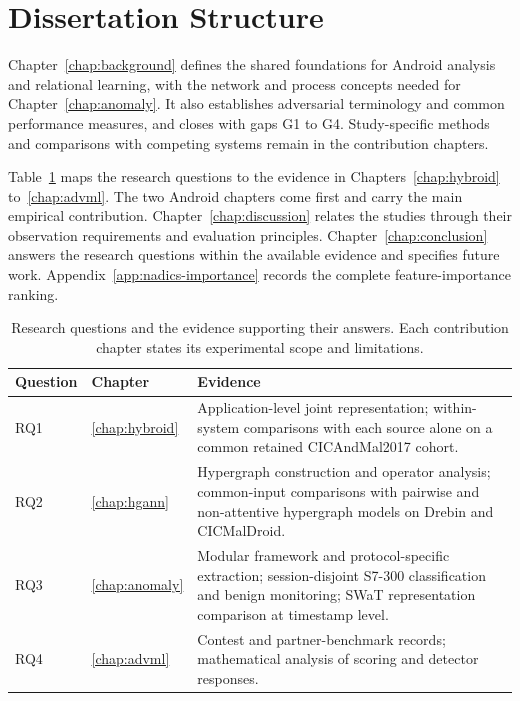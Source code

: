 \section{Dissertation Structure}
\label{sec:intro:structure}

Chapter~\ref{chap:background} defines the shared foundations for Android analysis and
relational learning, with the network and process concepts needed for
Chapter~\ref{chap:anomaly}. It also establishes adversarial terminology and common
performance measures, and closes with gaps G1 to G4. Study-specific methods and comparisons
with competing systems remain in the contribution chapters.

Table~\ref{tab:intro:map} maps the research questions to the evidence in
Chapters~\ref{chap:hybroid} to~\ref{chap:advml}. The two Android chapters come first and carry
the main empirical contribution. Chapter~\ref{chap:discussion} relates the studies through their
observation requirements and evaluation principles. Chapter~\ref{chap:conclusion} answers
the research questions within the available evidence and specifies future work.
Appendix~\ref{app:nadics-importance} records the complete \nadics{} feature-importance ranking.

\begin{table}[htbp]
  \caption{Research questions and the evidence supporting their answers.
  Each contribution chapter states its experimental scope and limitations.}
  \label{tab:intro:map}
  \small
  \begin{tabularx}{\textwidth}{@{}llX@{}}
    \toprule
    Question & Chapter & Evidence \\
    \midrule
    RQ1 & \ref{chap:hybroid}
      & Application-level joint representation; within-system comparisons with each source alone on a common retained CICAndMal2017 cohort. \\
    RQ2 & \ref{chap:hgann}
      & Hypergraph construction and operator analysis; common-input comparisons with pairwise and non-attentive hypergraph models on Drebin and CICMalDroid. \\
    RQ3 & \ref{chap:anomaly}
      & Modular framework and protocol-specific extraction; session-disjoint S7-300 classification and benign monitoring; SWaT representation comparison at timestamp level. \\
    RQ4 & \ref{chap:advml}
      & Contest and partner-benchmark records; mathematical analysis of scoring and detector responses. \\
    \bottomrule
  \end{tabularx}
\end{table}
